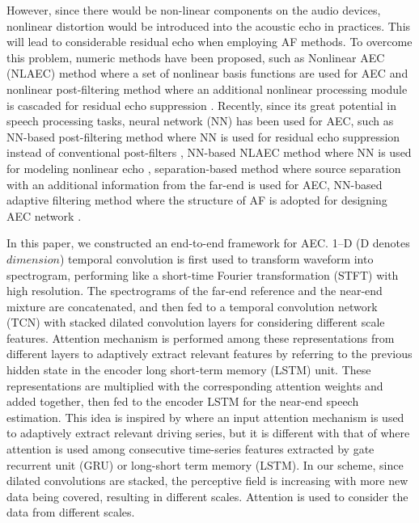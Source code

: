 \documentclass{article}
\begin{document}
\begin{sloppy}
However, since there would be non-linear components on the audio devices, nonlinear distortion would be introduced into the acoustic echo in practices.
This will lead to considerable residual echo when employing AF methods. To overcome this problem, numeric methods have been proposed, such as Nonlinear AEC (NLAEC) method where a set of nonlinear basis functions are used for AEC \cite{Stenger,Kuech,Carini} and nonlinear post-filtering method where an additional nonlinear processing module is cascaded for residual echo suppression \cite{Gustafsson,Turbin,Bendersky,Schwarz}. Recently, since its great potential in speech processing tasks, neural network (NN) has been used for AEC, such as NN-based post-filtering method where NN is used for residual echo suppression instead of conventional post-filters \cite{MaLu}, NN-based NLAEC method where NN is used for modeling nonlinear echo \cite{Halimeh1}, separation-based method where source separation with an additional information from the far-end \cite{DeLiang} is used for AEC, NN-based adaptive filtering method where the structure of AF is adopted for designing AEC network \cite{Fazel,Fazel1}.

In this paper, we constructed an end-to-end framework for AEC. 1--D (D denotes $dimension$) temporal convolution is first used to transform waveform into spectrogram, performing like a short-time Fourier transformation (STFT) with high resolution. The spectrograms of the far-end reference and the near-end mixture are concatenated, and then fed to a temporal convolution network (TCN) with stacked dilated convolution layers \cite{ref_tcn} for considering different scale features.
Attention mechanism \cite{ref_attention} is performed among these representations from different layers to adaptively extract relevant features by referring to the previous hidden state in the encoder long short-term memory (LSTM) unit. These representations are multiplied with the corresponding attention weights and added together, then fed to the encoder LSTM for the near-end speech estimation. This idea is inspired by \cite{ref_darnn} where an input attention mechanism is used to adaptively extract relevant driving series, but it is different with that of \cite{Fazel}\cite{xielie} where attention is used among consecutive time-series features extracted by gate recurrent unit (GRU) or long-short term memory (LSTM). In our scheme, since dilated convolutions are stacked, the perceptive field is increasing with more new data being covered, resulting in different scales. Attention is used to consider the data from different scales.


\end{sloppy}
\end{document}
